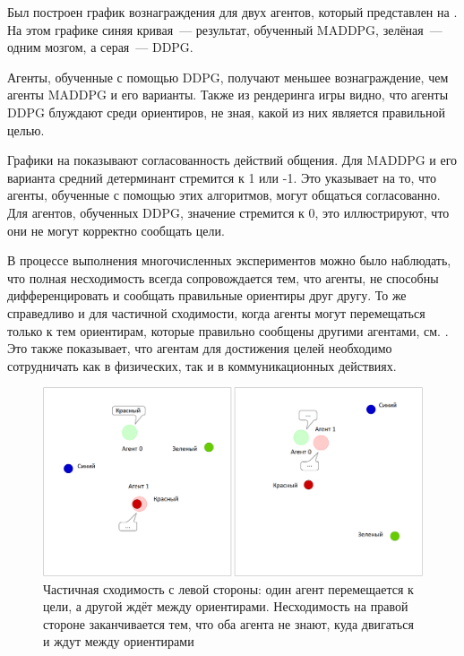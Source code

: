 Был построен график вознаграждения для двух агентов, который представлен на . На этом графике синяя кривая~--- результат, обученный MADDPG, зелёная~--- одним мозгом, а серая~--- DDPG.

Агенты, обученные с помощью DDPG, получают меньшее вознаграждение, чем агенты MADDPG и его варианты. Также из рендеринга игры видно, что агенты DDPG блуждают среди ориентиров, не зная, какой из них является правильной целью.

Графики на  показывают согласованность действий общения. Для MADDPG и его варианта средний детерминант стремится к 1 или -1. Это указывает на то, что агенты, обученные с помощью этих алгоритмов, могут общаться согласованно. Для агентов, обученных DDPG, значение стремится к 0, это иллюстрируют, что они не могут корректно сообщать цели.

В процессе выполнения многочисленных экспериментов можно было наблюдать, что полная несходимость всегда сопровождается тем, что агенты, не способны дифференцировать и сообщать правильные ориентиры друг другу. То же справедливо и для частичной сходимости, когда агенты могут перемещаться только к тем ориентирам, которые правильно сообщены другими агентами, см. . Это также показывает, что агентам для достижения целей необходимо сотрудничать как в физических, так и в коммуникационных действиях.

\begin{figure}[ht!]
    \center
    \includegraphics [scale=0.45] {my_folder/images/ch5/results-sr-non-convergency.png}
    \caption{Частичная сходимость с левой стороны: один агент перемещается к цели, а другой ждёт между ориентирами. Несходимость на правой стороне заканчивается тем, что оба агента не знают, куда двигаться и ждут между ориентирами}
    \label{fig:result-sr-non-convergency}
\end{figure}

